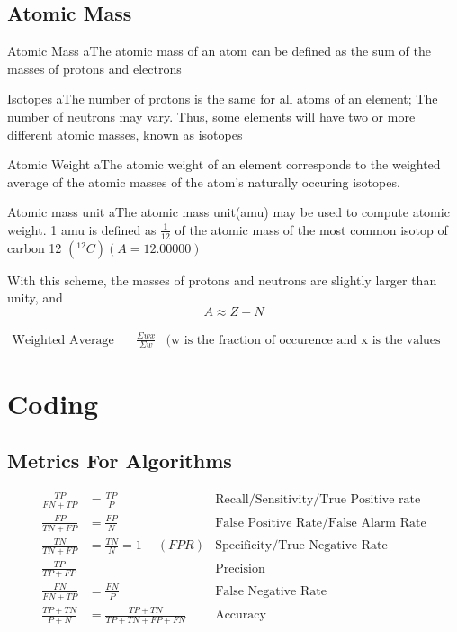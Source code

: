 \documentclass{report}
\begin{document}
\section{Atomic Mass}
\begin{definition}{Atomic Mass}
	aThe atomic mass of an atom can be defined as the sum of the masses of protons and electrons
\end{definition}
\begin{definition}{Isotopes}
	aThe number of protons is the same for all atoms of an element; The number of neutrons may vary. Thus, some elements will have two or more different atomic masses, known as isotopes
\end{definition}
\begin{definition}{Atomic Weight}
	aThe atomic weight of an element corresponds to the weighted average of the atomic masses of the atom's naturally occuring isotopes.
\end{definition}
\begin{definition}{Atomic mass unit}
	aThe atomic mass unit(amu) may be used to compute atomic weight. 1 amu is defined as $\frac{1}{12}$ of the atomic mass of the most common isotop of carbon  12 $(^{12}C)(A = 12.00000)$	
\end{definition}
With this scheme, the masses of protons and neutrons are slightly larger than unity, and 
\[
	A \approx Z + N
\]

\begin{align*}
	\text{Weighted Average = } &\frac{\Sigma w x}{\Sigma w} &\text{(w is the fraction of occurence and x is the values given.)}
\end{align*}
\chapter{Coding}
\lstset{language=Python}
\section{Metrics For Algorithms}
\begin{align*}
	\frac{TP}{FN+TP} &= \frac{TP}{P} &\text{Recall/Sensitivity/True Positive rate} \\
	\frac{FP}{TN+FP} &= \frac{FP}{N} &\text{False Positive Rate/False Alarm Rate} \\
	\frac{TN}{TN+FP} &= \frac{TN}{N} = 1 - (FPR) &\text{Specificity/True Negative Rate} \\
	\frac{TP}{TP+FP} & &\text{Precision} \\
	\frac{FN}{FN+TP} &= \frac{FN}{P} &\text{False Negative Rate} \\
	\frac{TP + TN}{P+N} &= \frac{TP+TN}{TP+TN+FP+FN} &\text{Accuracy} \\
\end{align*}
\end{document}
